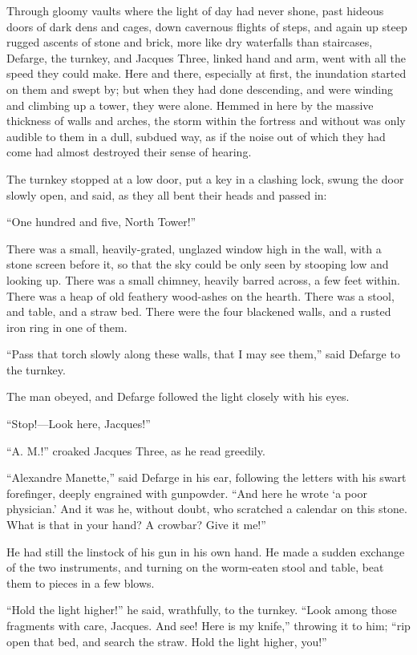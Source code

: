 Through gloomy vaults where the light of day had never shone, past
hideous doors of dark dens and cages, down cavernous flights of steps,
and again up steep rugged ascents of stone and brick, more like dry
waterfalls than staircases, Defarge, the turnkey, and Jacques Three,
linked hand and arm, went with all the speed they could make.  Here
and there, especially at first, the inundation started on them and
swept by; but when they had done descending, and were winding and
climbing up a tower, they were alone.  Hemmed in here by the massive
thickness of walls and arches, the storm within the fortress and without
was only audible to them in a dull, subdued way, as if the noise out of
which they had come had almost destroyed their sense of hearing.

The turnkey stopped at a low door, put a key in a clashing lock,
swung the door slowly open, and said, as they all bent their heads
and passed in:

``One hundred and five, North Tower!''

There was a small, heavily-grated, unglazed window high in the wall,
with a stone screen before it, so that the sky could be only seen by
stooping low and looking up.  There was a small chimney, heavily barred
across, a few feet within.  There was a heap of old feathery wood-ashes
on the hearth.  There was a stool, and table, and a straw bed.  There
were the four blackened walls, and a rusted iron ring in one of them.

``Pass that torch slowly along these walls, that I may see them,''
said Defarge to the turnkey.

The man obeyed, and Defarge followed the light closely with his eyes.

``Stop!---Look here, Jacques!''

``A. M.!'' croaked Jacques Three, as he read greedily.

``Alexandre Manette,'' said Defarge in his ear, following the letters
with his swart forefinger, deeply engrained with gunpowder.  ``And here
he wrote `a poor physician.' And it was he, without doubt, who scratched
a calendar on this stone.  What is that in your hand?  A crowbar?
Give it me!''

He had still the linstock of his gun in his own hand.  He made a
sudden exchange of the two instruments, and turning on the worm-eaten
stool and table, beat them to pieces in a few blows.

``Hold the light higher!'' he said, wrathfully, to the turnkey.
``Look among those fragments with care, Jacques.  And see!  Here is my knife,''
throwing it to him; ``rip open that bed, and search the straw.
Hold the light higher, you!''

